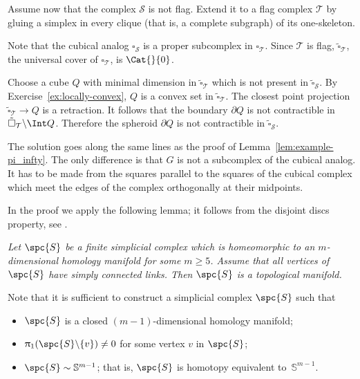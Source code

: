 Assume now that the complex $\mathcal{S}$ is not flag. 
Extend it to a flag complex $\mathcal{T}$ by gluing a simplex in every clique (that is, a complete subgraph) of its one-skeleton.

Note that the cubical analog $\square_{\mathcal{S}}$ is a proper subcomplex in $\square_{\mathcal{T}}$.
Since $\mathcal{T}$ is flag,
$\tilde\square_{\mathcal{T}}$,
the universal cover of $\square_{\mathcal{T}}$, is $\Cat{}{0}$.

Choose a cube $Q$ with minimal dimension in $\tilde\square_{\mathcal{T}}$ which is not present in $\tilde\square_{\mathcal{S}}$.
By Exercise~\ref{ex:locally-convex}, $Q$ is a convex set in $\tilde\square_{\mathcal{T}}$.
The closest point projection $\tilde\square_{\mathcal{T}}\to Q$ is a retraction.
It follows that the boundary $\partial Q$ is not contractible in $\tilde\square_{\mathcal{T}}\backslash\Int Q$.
Therefore the spheroid $\partial Q$ is not contractible in $\tilde\square_{\mathcal{S}}$.
\qeds

The solution goes along the same lines as the proof of Lemma~\ref{lem:example-pi_infty}.
The only difference is that $G$
is not a subcomplex of the cubical analog.
It has to be made from the squares parallel to the squares of the cubical complex which meet the edges of the complex orthogonally at their midpoints. \qeds

In the proof we apply the following lemma; 
it follows from the disjoint discs property, see \cite{edwards, daverman}.

\medskip

\emph{Let $\spc{S}$ be a finite simplicial complex which 
is homeomorphic to an $m$-dimensional homology manifold for some $m\ge 5$.
Assume that  all vertices of
$\spc{S}$ have simply connected links.
Then $\spc{S}$ is a topological manifold.}

\medskip


Note that it is sufficient to construct a simplicial complex $\spc{S}$
such that 
\begin{itemize}
\item $\spc{S}$ is a closed $(m-1)$-dimensional homology manifold;
\item $\pi_1(\spc{S}\backslash\{v\})\ne0$ for some vertex $v$ in $\spc{S}$;
\item $\spc{S}\sim \mathbb{S}^{m-1}$; that is, $\spc{S}$ is homotopy equivalent to~$\mathbb{S}^{m-1}$.
\end{itemize}

